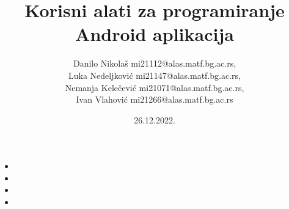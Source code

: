 \documentclass{beamer}
\title{Korisni alati za programiranje Android aplikacija}
\author{Danilo Nikolaš mi21112@alas.matf.bg.ac.rs,
\\Luka Nedeljković mi21147@alas.matf.bg.ac.rs,
\\ Nemanja Kelečević mi21071@alas.matf.bg.ac.rs,
 \\Ivan Vlahović mi21266@alas.matf.bg.ac.rs}
\institute[]{Matematički fakultet, Univerzitet u Beogradu}
\date{26.12.2022.}
\begin{document}
\begin{frame}
	\titlepage
\end{frame}

\begin{frame}
    \frametitle{} 
    \begin{itemize}
			\item
			\item 
			\item 
			\item  
   \end{itemize}
\end{frame}
\end{document}
